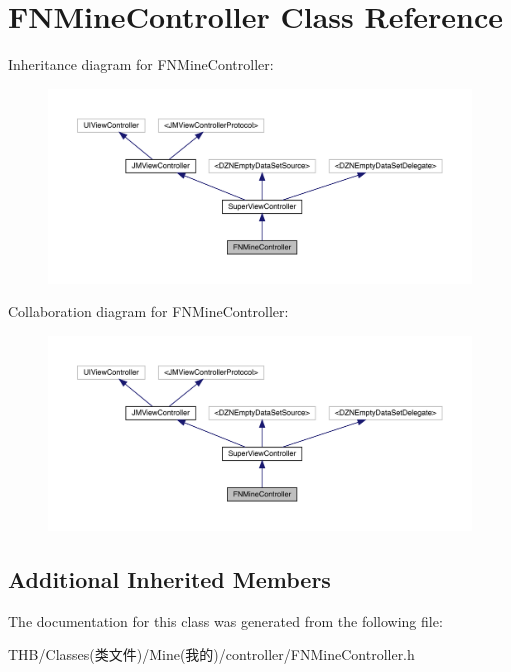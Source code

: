 \hypertarget{interface_f_n_mine_controller}{}\section{F\+N\+Mine\+Controller Class Reference}
\label{interface_f_n_mine_controller}


Inheritance diagram for F\+N\+Mine\+Controller\+:\nopagebreak
\begin{figure}[H]
\begin{center}
\leavevmode
\includegraphics[width=350pt]{interface_f_n_mine_controller__inherit__graph}
\end{center}
\end{figure}


Collaboration diagram for F\+N\+Mine\+Controller\+:\nopagebreak
\begin{figure}[H]
\begin{center}
\leavevmode
\includegraphics[width=350pt]{interface_f_n_mine_controller__coll__graph}
\end{center}
\end{figure}
\subsection*{Additional Inherited Members}


The documentation for this class was generated from the following file\+:\begin{DoxyCompactItemize}
\item 
T\+H\+B/\+Classes(类文件)/\+Mine(我的)/controller/F\+N\+Mine\+Controller.\+h\end{DoxyCompactItemize}
